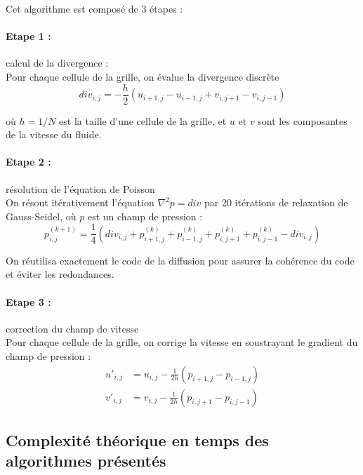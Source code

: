 \documentclass[a4paper]{article}
\begin{document}
Cet algorithme est composé de 3 étapes : 

    \paragraph{Etape 1 :} calcul de la divergence : \\ Pour chaque cellule de la grille, on évalue la divergence discrète
\begin{equation}
    {div}_{i,j} = -\frac{h}{2}(u_{i+1,j} - u_{i-1,j} + v_{i,j+1} - v_{i,j-1})
\end{equation}

où $h = 1/N$ est la taille d'une cellule de la grille, et $u$ et $v$ sont les composantes de la vitesse du fluide. 

    \paragraph{Etape 2 :} résolution de l'équation de Poisson \\
On résout itérativement l'équation $\nabla^2 p = div$ par 20 itérations de relaxation de Gauss-Seidel, où $p$ est un champ de pression :
\begin{equation}
p_{i,j}^{(k+1)} = \frac{1}{4}({div}_{i,j} + p_{i+1,j}^{(k)} + p_{i-1,j}^{(k)} + p_{i,j+1}^{(k)} + p_{i,j-1}^{(k)} - div_{i,j})
\end{equation}

On réutilisa exactement le code de la diffusion pour assurer la cohérence du code et éviter les redondances. 

    \paragraph{Etape 3 :} correction du champ de vitesse \\
Pour chaque cellule de la grille, on corrige la vitesse en soustrayant le gradient du champ de pression :
\begin{align}
    u'_{i,j} &= {u}_{i,j} - \frac{1}{2h} ( p_{i+1,j} - p_{i-1,j})  \\
    v'_{i,j} &= {v}_{i,j} - \frac{1}{2h} ( p_{i,j+1} - p_{i,j-1})
\end{align}



\subsection{Complexité théorique en temps des algorithmes présentés}
\end{document}
